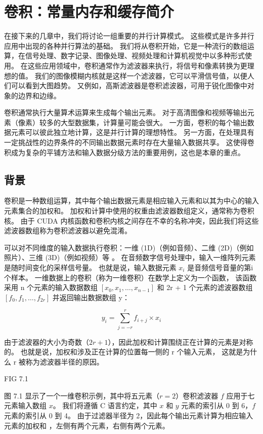 \section{卷积：常量内存和缓存简介}
在接下来的几章中，我们将讨论一组重要的并行计算模式。 这些模式是许多并行应用中出现的各种并行算法的基础。 
我们将从卷积开始，它是一种流行的数组运算，在信号处理、数字记录、图像处理、视频处理和计算机视觉中以多种形式使用。 
在这些应用领域中，卷积通常作为滤波器来执行，将信号和像素转换为更理想的值。 
我们的图像模糊内核就是这样一个滤波器，它可以平滑信号值，以便人们可以看到大图趋势。 
又例如，高斯滤波器是卷积滤波器，可用于锐化图像中对象的边界和边缘。

卷积通常执行大量算术运算来生成每个输出元素。 对于高清图像和视频等输出元素（像素）较多的大型数据集，计算量可能会很大。 
一方面，卷积的每个输出数据元素可以彼此独立地计算，这是并行计算的理想特性。 
另一方面，在处理具有一定挑战性的边界条件的不同输出数据元素时存在大量输入数据共享。 
这使得卷积成为复杂的平铺方法和输入数据分级方法的重要用例，这也是本章的重点。

\subsection{背景}
卷积是一种数组运算，其中每个输出数据元素是相应输入元素和以其为中心的输入元素集合的加权和。 
加权和计算中使用的权重由滤波器数组定义，通常称为卷积核。 
由于 CUDA 内核函数和卷积内核之间存在不幸的名称冲突，因此我们将这些滤波器数组称为卷积滤波器以避免混淆。

可以对不同维度的输入数据执行卷积：一维 (1D)（例如音频）、二维 (2D)（例如照片）、三维 (3D)（例如视频）等 。 
在音频数字信号处理中，输入一维阵列元素是随时间变化的采样信号量。 也就是说，输入数据元素 $x_i$ 是音频信号音量的第i个样本。 
一维数据上的卷积（称为一维卷积）在数学上定义为一个函数，
该函数采用 n 个元素的输入数据数组 $[x_0 , x_1 , \ldots , x_{n-1} ]$ 
和 2r + 1 个元素的滤波器数组 $[f_0 , f_1 , \ldots , f_{2r} ]$ 并返回输出数据数组 y：

$$
y_i = \sum^r_{j=-r} f_{i+j}\times x_i
$$

由于滤波器的大小为奇数（$2r + 1$），因此加权和计算围绕正在计算的元素是对称的。
也就是说，加权和涉及正在计算的位置每一侧的 r 个输入元素， 这就是为什么 r 被称为滤波器半径的原因。

{\color{red} FIG 7.1}

图 7.1 显示了一个一维卷积示例，其中将五元素（$r = 2$）卷积滤波器 $f$ 应用于七元素输入数组 $x$。 
我们将遵循 C 语言约定，其中 $x$ 和 $y$ 元素的索引从 0 到 6，$f$ 元素的索引从 0 到 4。
由于过滤器半径为 2，因此每个输出元素计算为相应输入元素的加权和 ，左侧有两个元素，右侧有两个元素。

